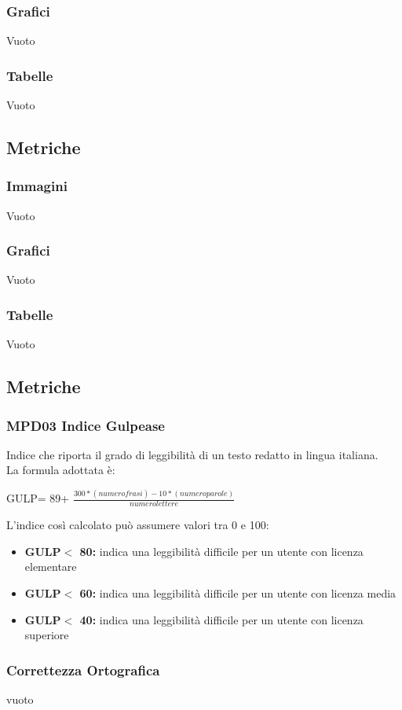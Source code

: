 \subsubsection{Grafici}
{Vuoto}
\subsubsection{Tabelle}
{Vuoto}
\subsection{Metriche}
\subsubsection{Immagini}
{Vuoto}
\subsubsection{Grafici}
{Vuoto}
\subsubsection{Tabelle}
{Vuoto}
\subsection{Metriche}
\subsubsection{MPD03 Indice Gulpease}
Indice che riporta il grado di leggibilità di un testo redatto in lingua italiana. 
\\La formula adottata è:
\begin{center}
GULP= 89+ $\frac{300*(numero frasi)-10*(numero parole)}{numero lettere}$
\end{center}
L'indice così calcolato può assumere valori tra 0 e 100:
\begin{itemize}
\item \textbf{GULP$<$ 80:} indica una leggibilità difficile per un utente con licenza elementare
	\item \textbf{GULP$<$ 60:} indica una leggibilità difficile per un utente con licenza media
		\item \textbf{GULP$<$ 40:} indica una leggibilità difficile per un utente con licenza superiore
\end{itemize}

\subsubsection{Correttezza Ortografica}
{vuoto}
